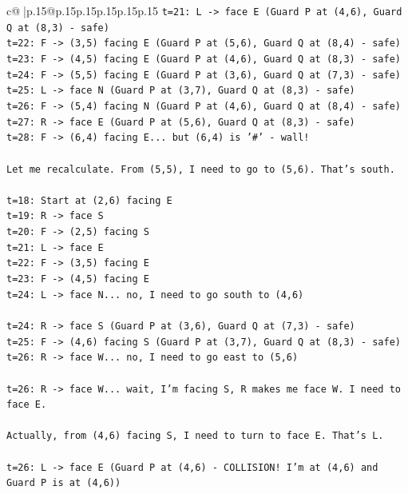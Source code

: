 \documentclass{article}
\begin{document}
{\begin{supertabular}{c@{$\;$}|p{.15\linewidth}@{}p{.15\linewidth}p{.15\linewidth}p{.15\linewidth}p{.15\linewidth}p{.15\linewidth}}
{{{\texttt{t=21: L {-}> face E (Guard P at (4,6), Guard Q at (8,3) {-} safe)} \\
\texttt{t=22: F {-}> (3,5) facing E (Guard P at (5,6), Guard Q at (8,4) {-} safe)} \\
\texttt{t=23: F {-}> (4,5) facing E (Guard P at (4,6), Guard Q at (8,3) {-} safe)} \\
\texttt{t=24: F {-}> (5,5) facing E (Guard P at (3,6), Guard Q at (7,3) {-} safe)} \\
\texttt{t=25: L {-}> face N (Guard P at (3,7), Guard Q at (8,3) {-} safe)} \\
\texttt{t=26: F {-}> (5,4) facing N (Guard P at (4,6), Guard Q at (8,4) {-} safe)} \\
\texttt{t=27: R {-}> face E (Guard P at (5,6), Guard Q at (8,3) {-} safe)} \\
\texttt{t=28: F {-}> (6,4) facing E... but (6,4) is '\#' {-} wall!} \\
\\ 
\texttt{Let me recalculate. From (5,5), I need to go to (5,6). That's south.} \\
\\ 
\texttt{t=18: Start at (2,6) facing E} \\
\texttt{t=19: R {-}> face S} \\
\texttt{t=20: F {-}> (2,5) facing S} \\
\texttt{t=21: L {-}> face E} \\
\texttt{t=22: F {-}> (3,5) facing E} \\
\texttt{t=23: F {-}> (4,5) facing E} \\
\texttt{t=24: L {-}> face N... no, I need to go south to (4,6)} \\
\\ 
\texttt{t=24: R {-}> face S (Guard P at (3,6), Guard Q at (7,3) {-} safe)} \\
\texttt{t=25: F {-}> (4,6) facing S (Guard P at (3,7), Guard Q at (8,3) {-} safe)} \\
\texttt{t=26: R {-}> face W... no, I need to go east to (5,6)} \\
\\ 
\texttt{t=26: R {-}> face W... wait, I'm facing S, R makes me face W. I need to face E.} \\
\\ 
\texttt{Actually, from (4,6) facing S, I need to turn to face E. That's L.} \\
\\ 
\texttt{t=26: L {-}> face E (Guard P at (4,6) {-} COLLISION! I'm at (4,6) and Guard P is at (4,6))} \\
}}}
\end{supertabular}}
\end{document}
